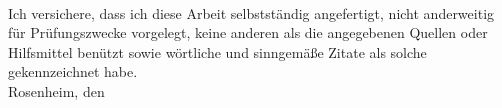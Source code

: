 \cleardoublepage
\thispagestyle{empty}
\vspace*{\fill}
\medskip \\
Ich versichere, dass ich diese Arbeit selbstständig angefertigt, nicht anderweitig für Prüfungszwecke vorgelegt, keine anderen als die angegebenen Quellen oder Hilfsmittel benützt sowie wörtliche und sinngemäße Zitate als solche gekennzeichnet habe. 
\medskip \\
Rosenheim, den \lasmdate
\vspace{5ex} \\
\lasmauthor
